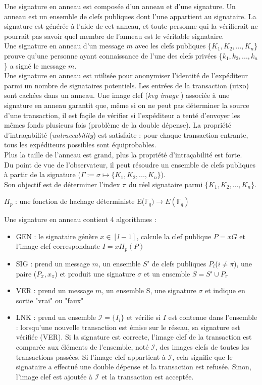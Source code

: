 Une signature en anneau est composée d'un anneau et d'une signature. 
Un anneau est un ensemble de clefs publiques dont l'une appartient au signataire. 
La signature est générée à l'aide de cet anneau, et toute personne qui la 
vérifierait ne pourrait pas savoir quel membre de l'anneau est le véritable 
signataire.\\
Une signature en anneau d'un message $m$ avec les clefs publiques 
\{$K_1, K_2,...,K_n$\} prouve qu'une personne ayant connaissance de l'une des clefs 
privées \{$k_1, k_2,...,k_n$\} a signé le message $m$.\\
Une signature en anneau est utilisée pour anonymiser l'identité de l'expéditeur 
parmi un nombre de signataires potentiels. 
Les entrées de la transaction (\acrshort{utxo}) sont cachées dans un anneau. 
Une image clef (\textit{\og key image \fg})
associée  à une signature en anneau garantit que, même si on ne peut pas déterminer
la source d'une transaction, il est  façile de vérifier si l'expéditeur a tenté 
d'envoyer les mêmes fonds plusieurs fois (problème de la double dépense). 
La propriété d'intraçabilité\cite[1]{monero_wp} (\og \textit{untraceability}\fg) est 
satisfaite : pour chaque transaction entrante, tous les expéditeurs possibles sont 
équiprobables.\\ 
Plus la taille de l'anneau est grand, plus la propriété d'intraçabilité est forte.\\
Du point de vue de l'observateur, il peut résoudre un ensemble de clefs publiques 
à partir de la signature ($\Gamma := \sigma \mapsto \{K_1, K_2,...,K_n\}$).\\
Son objectif est de déterminer l'index $\pi$ du réel signataire parmi \{$K_1, K_2,...,K_n$\}.

\bigskip 
\noindent
$H_p$ : une fonction de hachage déterministe E($\mathds{F}_q) \rightarrow E( \mathds{F}_q)$

\bigskip 
\noindent 
Une signature en anneau contient 4 algorithmes :
\begin{itemize}
    \item GEN : le signataire génère $x \in [l-1]$, calcule la clef publique $P = xG$ 
    et l'image clef correspondante $I = xH_p(P)$\footnotemark
    \item SIG : prend un message $m$, un ensemble $S'$ de clefs publiques 
    {$P_i$}($i \neq \pi$), une paire ($P_\pi, x_\pi$) et produit une signature
    $\sigma$ et un ensemble $S=S'\cup{P_\pi}$ 
    \item VER : prend un message $m$, un ensemble S, une signature $\sigma$ et
    indique en sortie "vrai" ou "faux"
    \item LNK : prend un ensemble $\mathcal{I}=\{I_i\}$ et vérifie si $I$ est contenue dans l'ensemble : lorsqu’une nouvelle transaction est émise sur le réseau, sa signature est vérifiée (VER). Si la signature est correcte, l'image clef de la transaction est comparée aux éléments de l’ensemble, noté $\mathcal{I}$, des images clefs de toutes les transactions passées. Si l'image clef appartient à $\mathcal{I}$, cela signifie que le signataire a effectué une double dépense et la transaction est refusée. Sinon, l'image clef est ajoutée à $\mathcal{I}$ et la transaction est acceptée.
\end{itemize}

